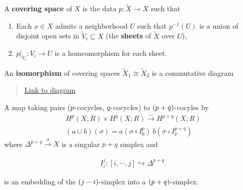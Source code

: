 \begin{definition}

A \textbf{covering space} of \(X\) is the data \(p: \tilde X \to X\)
such that

\begin{enumerate}
\def\labelenumi{\arabic{enumi}.}
\tightlist
\item
  Each \(x\in X\) admits a neighborhood \(U\) such that \(p ^{-1} (U)\)
  is a union of disjoint open sets in \(\tilde V_i \subseteq X\) (the
  \textbf{sheets} of \(\tilde X\) over \(U\)),
\item
  \({ \left.{{p}} \right|_{{V_i}} }: V_i \to U\) is a homeomorphism for
  each sheet.
\end{enumerate}

An \textbf{isomorphism} of covering spaces
\(\tilde X_1 \cong \tilde X_2\) is a commutative diagram

\begin{center}
\end{center}

\begin{quote}
\href{https://q.uiver.app/?q=WzAsMyxbMCwwLCJcXHRpbGRlIFhfMSJdLFsxLDIsIlgiXSxbMiwwLCJcXHRpbGRlIFhfMiJdLFswLDEsInBfMSIsMl0sWzIsMSwicF8yIl0sWzAsMiwiZiJdXQ==}{Link
to diagram}
\end{quote}

\end{definition}

\begin{definition}

A map taking pairs (\(p{\hbox{-}}\)cocycles, \(q{\hbox{-}}\)cocycles) to
\((p+q){\hbox{-}}\)cocyles by
\begin{align*}
H^p(X; R) \times H^q(X; R) \xrightarrow{\smile} H^{p+q}(X; R)\\
(a \cup b)(\sigma) = a(\sigma \circ I_{0}^p)~b(\sigma \circ I_{p}^{p+q})
\end{align*}
where \(\Delta^{p+q} \xrightarrow{\sigma} X\) is a singular \(p+q\)
simplex and

\begin{align*}I_{i}^j: [i, \cdots, j] \hookrightarrow\Delta^{p+q}
.\end{align*}

is an embedding of the \((j-i){\hbox{-}}\)simplex into a
\((p+q){\hbox{-}}\)simplex.

\end{definition}

